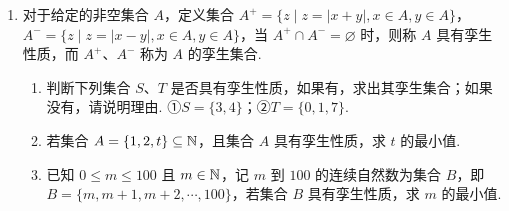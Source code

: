 \documentclass[a4paper,11pt]{article}
\begin{document}
\begin{enumerate}
\ansspace[8]

\item 对于给定的非空集合 $A$，定义集合 $A^+=\{z\mid z=|x+y|,x\in A,y\in A\}$，$A^-=\{z\mid z=|x-y|,x\in A,y\in A\}$，当 $A^+\cap A^-=\varnothing$ 时，则称 $A$ 具有孪生性质，而 $A^+$、$A^-$ 称为 $A$ 的孪生集合.  %

\begin{enumerate}[label=(\arabic*)]
\item 判断下列集合 $S$、$T$ 是否具有孪生性质，如果有，求出其孪生集合；如果没有，请说明理由. ①$S=\{3,4\}$；②$T=\{0,1,7\}$.
\item 若集合 $A=\{1,2,t\}\subseteq\mathbb{N}$，且集合 $A$ 具有孪生性质，求 $t$ 的最小值.
\item 已知 $0\leqslant m\leqslant100$ 且 $m\in\mathbb{N}$，记 $m$ 到 $100$ 的连续自然数为集合 $B$，即 $B=\{m,m+1,m+2,\cdots,100\}$，若集合 $B$ 具有孪生性质，求 $m$ 的最小值.
\end{enumerate}

\ifanswer
\solbegin
{}
\solend
\fi

\ansspace*[10]

\end{enumerate}
\end{document}
